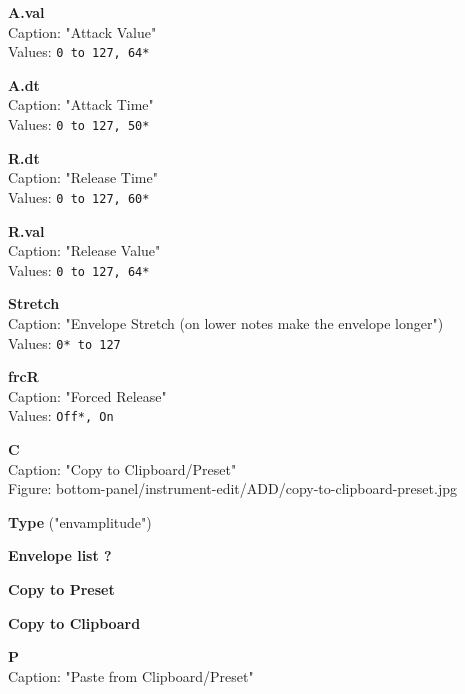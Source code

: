 \documentclass[
 11pt,
 twoside,
 a4paper,
 headinclude,
 footinclude,
 final                                 %
]{article}
\begin{document}
\begin{enumber}
\begin{enumber}
\begin{enumber}
\begin{enumber}
            \begin{enumber}
               \item \textbf{A.val} \\
                  Caption: "Attack Value" \\
                  Values: \texttt{0 to 127, 64*}
               \item \textbf{A.dt} \\
                  Caption: "Attack Time" \\
                  Values: \texttt{0 to 127, 50*}
               \item \textbf{R.dt} \\
                  Caption: "Release Time" \\
                  Values: \texttt{0 to 127, 60*}
               \item \textbf{R.val} \\
                  Caption: "Release Value" \\
                  Values: \texttt{0 to 127, 64*}
               \item \textbf{Stretch} \\
                  Caption: "Envelope Stretch (on lower notes make the envelope longer") \\
                  Values: \texttt{0* to 127}
               \item \textbf{frcR} \\
                  Caption: "Forced Release" \\
                  Values: \texttt{Off*, On}
               \item \textbf{C} \\
                  Caption: "Copy to Clipboard/Preset" \\
                  Figure: bottom-panel/instrument-edit/ADD/copy-to-clipboard-preset.jpg
                  \begin{enumber}
                     \item \textbf{Type} ("envamplitude")
                     \item \textbf{Envelope list ?}
                     \item \textbf{Copy to Preset}
                     \item \textbf{Copy to Clipboard}
                  \end{enumber}
               \item \textbf{P} \\
                  Caption: "Paste from Clipboard/Preset" \\

\end{enumber}
\end{enumber}
\end{enumber}
\end{enumber}
\end{enumber}
\end{document}
